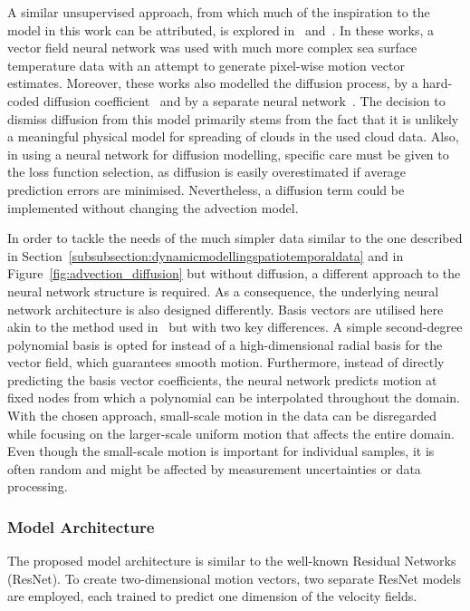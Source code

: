 A similar unsupervised approach, from which much of the inspiration to the model in this work can be attributed, is explored in~\cite{debezenac} and~\cite{deepide}.
In these works, a vector field neural network was used with much more complex sea surface temperature data with an attempt to generate pixel-wise motion vector estimates.
Moreover, these works also modelled the diffusion process, by a hard-coded diffusion coefficient~\cite{debezenac} and by a separate neural network~\cite{deepide}.
The decision to dismiss diffusion from this model primarily stems from the fact that it is unlikely a meaningful physical model for spreading of clouds in the used cloud data.
Also, in using a neural network for diffusion modelling, specific care must be given to the loss function selection, as diffusion is easily overestimated if average prediction errors are minimised.
Nevertheless, a diffusion term could be implemented without changing the advection model.

In order to tackle the needs of the much simpler data similar to the one described in Section~\ref{subsubsection:dynamicmodellingspatiotemporaldata} and in Figure~\ref{fig:advection_diffusion} but without diffusion, a different approach to the neural network structure is required.
As a consequence, the underlying neural network architecture is also designed differently.
Basis vectors are utilised here akin to the method used in~\cite{deepide} but with two key differences.
A simple second-degree polynomial basis is opted for instead of a high-dimensional radial basis for the vector field, which guarantees smooth motion.
Furthermore, instead of directly predicting the basis vector coefficients, the neural network predicts motion at fixed nodes from which a polynomial can be interpolated throughout the domain.
With the chosen approach, small-scale motion in the data can be disregarded while focusing on the larger-scale uniform motion that affects the entire domain.
Even though the small-scale motion is important for individual samples, it is often random and might be affected by measurement uncertainties or data processing.

\subsubsection{Model Architecture}
The proposed model architecture is similar to the well-known Residual Networks (ResNet).
To create two-dimensional motion vectors, two separate ResNet models are employed, each trained to predict one dimension of the velocity fields.

